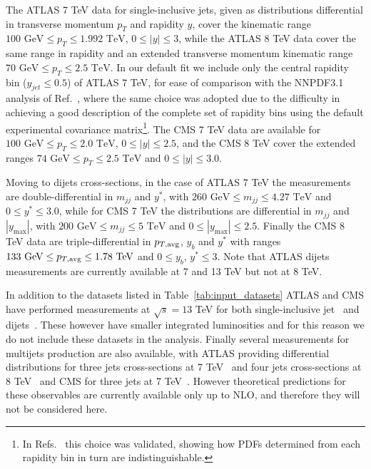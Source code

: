 %
The ATLAS 7 TeV data for single-inclusive jets, given as distributions differential in transverse momentum 
$p_T$ and rapidity $y$, cover the kinematic range $100\,\, \text{GeV} \leq p_T \leq 1.992\,\, \text{TeV}$,
$0 \leq |y| \leq 3$, while the ATLAS 8 TeV data cover the same range in rapidity and an extended transverse momentum
kinematic range $70\,\, \text{GeV} \leq p_T \leq 2.5\,\, \text{TeV}$.
In our default fit we include only the central rapidity bin ($y_{jet} \leq 0.5$) of ATLAS 7 TeV, 
for ease of comparison with the NNPDF3.1 analysis of Ref.~\cite{Ball:2017nwa}, where the same choice was adopted due to
the difficulty in achieving a good description of the complete set of rapidity bins using
the default experimental covariance matrix\footnote{In Refs.~\cite{Ball:2017nwa,Nocera:2017zge} this choice was validated,
showing how PDFs determined from each rapidity bin in turn are indistinguishable.}.
The CMS 7 TeV data are available for $100\,\, \text{GeV} \leq p_T \leq 2.0\,\, \text{TeV}$,
$0 \leq |y| \leq 2.5$, and the CMS 8 TeV cover the extended
ranges $74\,\, \text{GeV} \leq p_T \leq 2.5\,\, \text{TeV}$ and $0 \leq |y| \leq 3.0$.

%
Moving to dijets cross-sections, in the case of ATLAS 7 TeV the measurements are double-differential in
$m_{jj}$ and $y^*$, with
$260\,\,\text{GeV}\leq m_{jj} \leq 4.27\,\,\text{TeV}$ and $0 \leq y^* \leq 3.0$, while for CMS 7 TeV
the distributions are differential in  $m_{jj}$ and $|y_{\text{max}}|$, with
$200\,\,\text{GeV}\leq m_{jj} \leq 5\,\,\text{TeV}$ and $0 \leq |y_{\text{max}}| \leq 2.5$.  
Finally the CMS 8 TeV data are triple-differential in $p_{T,\rm avg}$, $y_b$ and $y^*$ with
ranges $133\,\,\text{GeV} \leq p_{T,\rm avg} \leq 1.78\,\,\text{TeV}$ and $0\leq y_b,\,y^* \leq 3$.
Note that ATLAS dijets measurements are currently available at 7 and 13 TeV but not at 8 TeV.

%
In addition to the datasets listed in Table~\ref{tab:input_datasets} ATLAS and CMS have performed
measurements at $\sqrt{s}=13$ TeV for both single-inclusive jet~\cite{Aaboud:2017wsi,Khachatryan:2016wdh}
and dijets~\cite{Aaboud:2017wsi,Sirunyan:2020uoj}. These however have smaller integrated luminosities and for this reason
we do not include these datasets in the analysis. 
%
Finally several measurements for multijets production are also available, with ATLAS providing differential distributions for
three jets cross-sections at 7 TeV~\cite{Aad:2014rma} and four jets cross-sections at 8 TeV~\cite{Aad:2015nda} 
and CMS for three jets at 7 TeV~\cite{CMS:2014mna}.
However theoretical predictions for these observables are currently available only up to NLO, and therefore they will
not be considered here.

